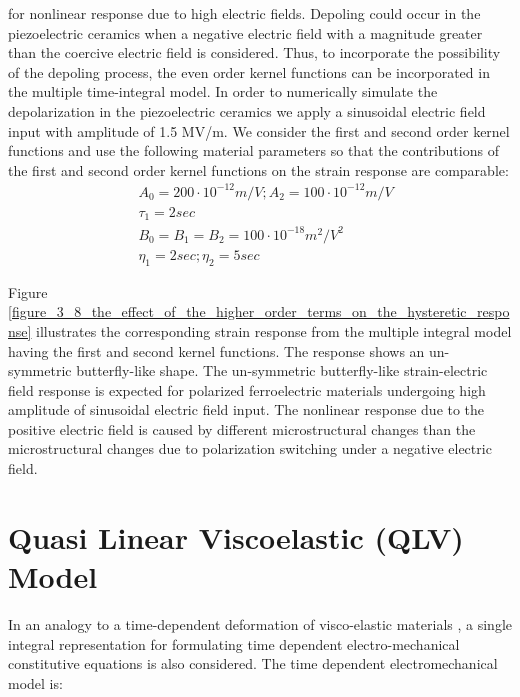 for nonlinear response due to high electric fields. Depoling could occur in the piezoelectric
ceramics when a negative electric field with a magnitude greater than the coercive electric
field is considered. Thus, to incorporate the possibility of the depoling process, the even
order kernel functions can be incorporated in the multiple time-integral model.  In order to
numerically simulate the depolarization in the piezoelectric ceramics we apply a sinusoidal
electric field input with amplitude of 1.5 MV/m. We consider the first and second order
kernel functions and use the following material parameters so that the contributions of the
first and second order kernel functions on the strain response are comparable:
\begin{equation}
\begin{aligned}
&A_0=200 \cdot 10^{-12} m/V; A_2=100 \cdot 10^{-12} m/V \\
&\tau_1=2 sec \\
&B_0=B_1=B_2=100 \cdot 10^{-18} m^2/V^2 \\
&\eta_1=2sec; \eta_2=5 sec  
\end{aligned}
\label{3_5_EQN:coefficients_}
\end{equation}

Figure \ref{figure_3_8_the_effect_of_the_higher_order_terms_on_the_hysteretic_response} illustrates the corresponding strain response from the multiple integral model
having the first and second kernel functions. The response shows an un-symmetric
butterfly-like shape. The un-symmetric butterfly-like strain-electric field response is
expected for polarized ferroelectric materials undergoing high amplitude of sinusoidal
electric field input. The nonlinear response due to the positive electric field is caused by
different microstructural changes than the microstructural changes due to polarization
switching under a negative electric field. 



\section{Quasi Linear Viscoelastic (QLV) Model} 

In an analogy to a time-dependent deformation of visco-elastic materials \cite{Wineman2000}, 
a single integral representation for formulating time dependent electro-mechanical constitutive equations is also considered.
The time dependent electromechanical model is:  

